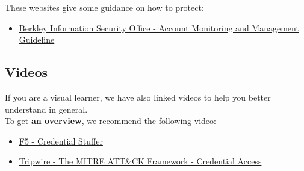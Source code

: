 These websites give some guidance on how to protect:
\begin{itemize}
    \item \href{https://security.berkeley.edu/account-monitoring-and-management-guideline}{Berkley Information Security Office - Account Monitoring and Management Guideline}
\end{itemize}

\subsection{Videos}
If you are a visual learner, we have also linked videos to help you better understand in general. \\
To get \textbf{an overview}, we recommend the following video: 
\begin{itemize}
    \item \href{https://www.f5.com/solutions/credential-stuffing}{F5 - Credential Stuffer}
    \item \href{https://www.tripwire.com/state-of-security/mitre-framework/the-mitre-attck-framework-credential-access/}{Tripwire - The MITRE ATT\&CK Framework - Credential Access}
\end{itemize}